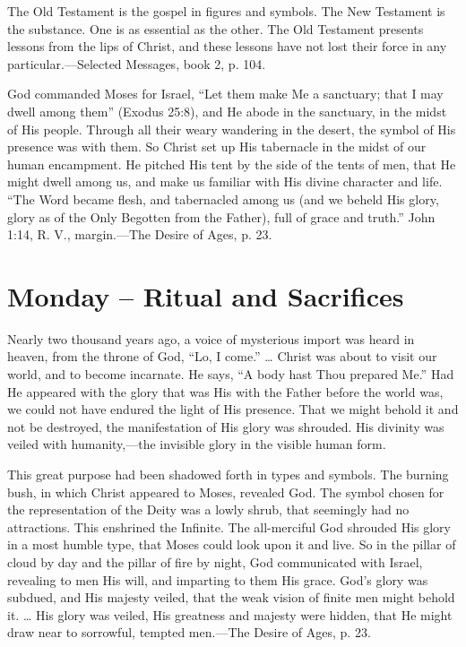 \documentclass[a4paper, 10pt, twoside, headings=small]{scrartcl}
\begin{document}
\begin{multicols}{2}
The Old Testament is the gospel in figures and symbols. The New Testament is the substance. One is as essential as the other. The Old Testament presents lessons from the lips of Christ, and these lessons have not lost their force in any particular.—Selected Messages, book 2, p. 104.

God commanded Moses for Israel, “Let them make Me a sanctuary; that I may dwell among them” (Exodus 25:8), and He abode in the sanctuary, in the midst of His people. Through all their weary wandering in the desert, the symbol of His presence was with them. So Christ set up His tabernacle in the midst of our human encampment. He pitched His tent by the side of the tents of men, that He might dwell among us, and make us familiar with His divine character and life. “The Word became flesh, and tabernacled among us (and we beheld His glory, glory as of the Only Begotten from the Father), full of grace and truth.” John 1:14, R. V., margin.—The Desire of Ages, p. 23.

\section*{Monday – Ritual and Sacrifices}

Nearly two thousand years ago, a voice of mysterious import was heard in heaven, from the throne of God, “Lo, I come.” … Christ was about to visit our world, and to become incarnate. He says, “A body hast Thou prepared Me.” Had He appeared with the glory that was His with the Father before the world was, we could not have endured the light of His presence. That we might behold it and not be destroyed, the manifestation of His glory was shrouded. His divinity was veiled with humanity,—the invisible glory in the visible human form.

This great purpose had been shadowed forth in types and symbols. The burning bush, in which Christ appeared to Moses, revealed God. The symbol chosen for the representation of the Deity was a lowly shrub, that seemingly had no attractions. This enshrined the Infinite. The all-merciful God shrouded His glory in a most humble type, that Moses could look upon it and live. So in the pillar of cloud by day and the pillar of fire by night, God communicated with Israel, revealing to men His will, and imparting to them His grace. God’s glory was subdued, and His majesty veiled, that the weak vision of finite men might behold it. … His glory was veiled, His greatness and majesty were hidden, that He might draw near to sorrowful, tempted men.—The Desire of Ages, p. 23.


\end{multicols}
\end{document}
